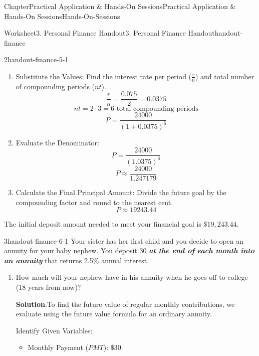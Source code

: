 \documentclass[oneside,10pt,]{book}
\newcommand{\blocktitlefont}{\relax}
\newcommand{\ptxlistdisc}{\raisebox{0.3ex}{\textbullet}}
\newcommand{\alert}[1]{\textbf{\textit{#1}}}
\begin{document}
\begin{chapterptx}{Chapter}{Practical Application \& Hands-On Sessions}{}{Practical Application \& Hands-On Sessions}{}{}{Hands-On-Sessions}
\begin{worksheet-section}{Worksheet}{3. Personal Finance Handout}{}{3. Personal Finance Handout}{}{}{handout-finance}
\begin{divisionexercise}{2}{}{}{handout-finance-5-1}
\begin{enumerate}[label={(\alph*)}]
\begin{equation*}
\end{equation*}
%
\item{}Substitute the Values: Find the interest rate per period (\(\frac{r}{n}\)) and total number of compounding periods (\(nt\)).%
\begin{equation*}
\frac{r}{n} = \frac{0.075}{2} = 0.0375
\end{equation*}
%
\begin{equation*}
nt = 2 \cdot 3 = 6 \text{ total compounding periods}
\end{equation*}
%
\begin{equation*}
P = \frac{24000}{(1 + 0.0375)^{6}}
\end{equation*}
%
\item{}Evaluate the Denominator:%
\begin{equation*}
P = \frac{24000}{(1.0375)^{6}}
\end{equation*}
%
\begin{equation*}
P \approx \frac{24000}{1.247179}
\end{equation*}
%
\item{}Calculate the Final Principal Amount: Divide the future goal by the compounding factor and round to the nearest cent.%
\begin{equation*}
P \approx 19243.44
\end{equation*}
%
\end{enumerate}
%
\par
The initial deposit amount needed to meet your financial goal is \(\$19,243.44\).%
\end{divisionexercise}%
\clearpage
\begin{divisionexercise}{3}{}{}{handout-finance-6-1}%
Your sister has her first child and you decide to open an annuity for your baby nephew. You deposit \textdollar{}30 \alert{at the end of each month into an annuity} that returns 2.5\% annual interest.%
\begin{enumerate}[font=\bfseries,label=(\alph*),ref=\alph*]%
\item{}How much will your nephew have in his annuity when he goes off to college (18 years from now)?%
\par\smallskip%
\noindent\textbf{\blocktitlefont Solution}.\hypertarget{handout-finance-6-1-2-2}{}\quad{}To find the future value of regular monthly contributions, we evaluate using the future value formula for an ordinary annuity.%
\par
Identify Given Variables:%
\begin{itemize}[label=\ptxlistdisc]
\item{}Monthly Payment (\(PMT\)): \(\$30\)%

\end{itemize}
\end{enumerate}
\end{divisionexercise}
\end{worksheet-section}
\end{chapterptx}
\end{document}
